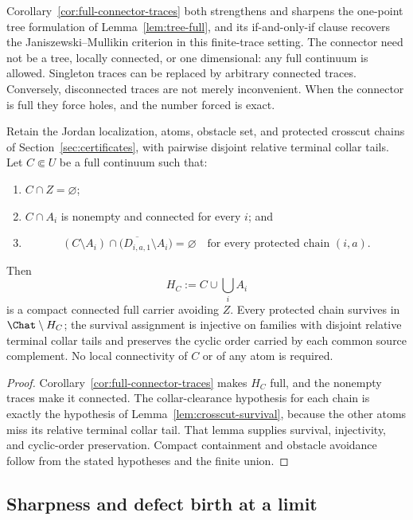 Corollary~\ref{cor:full-connector-traces} both strengthens and sharpens
the one-point tree formulation of Lemma~\ref{lem:tree-full}, and its
if-and-only-if clause recovers the Janiszewski--Mullikin criterion in this
finite-trace setting.  The connector need not be a tree, locally
connected, or one dimensional: any full continuum is allowed.  Singleton
traces can be replaced by arbitrary connected traces.  Conversely,
disconnected traces are not merely inconvenient.  When the connector is
full they force holes, and the number forced is exact.

\begin{corollary}
\label{cor:continuum-connector}
Retain the Jordan localization, atoms, obstacle set, and protected
crosscut chains of Section~\ref{sec:certificates}, with pairwise disjoint
relative terminal collar tails.  Let $C\Subset U$ be a full continuum such
that:
\begin{enumerate}
\item $C\cap Z=\varnothing$;
\item $C\cap A_i$ is nonempty and connected for every $i$; and
\item
\[
 (C\setminus A_i)\cap
 \bigl(\overline{D_{i,a,1}}\setminus A_i\bigr)=\varnothing
 \quad\text{for every protected chain }(i,a).
\]
\end{enumerate}
Then
\[
 H_C:=C\cup\bigcup_iA_i
\]
is a compact connected full carrier avoiding $Z$.  Every protected chain
survives in $\Chat\setminus H_C$; the survival assignment is injective on
families with disjoint relative terminal collar tails and preserves the
cyclic order carried by each common source complement.  No local
connectivity of $C$ or of any atom is required.
\end{corollary}

\begin{proof}
Corollary~\ref{cor:full-connector-traces} makes $H_C$ full, and the nonempty
traces make it connected.  The collar-clearance hypothesis for each chain is
exactly the hypothesis of Lemma~\ref{lem:crosscut-survival}, because the
other atoms miss its relative terminal collar tail.  That lemma supplies
survival, injectivity, and cyclic-order preservation.  Compact containment
and obstacle avoidance follow from the stated hypotheses and the finite
union.
\end{proof}

\subsection{Sharpness and defect birth at a limit}
\label{subsec:G-limit-defect}

